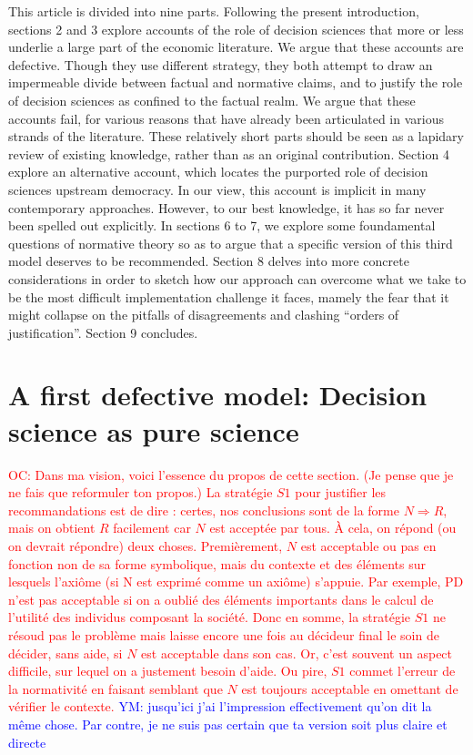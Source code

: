 \documentclass[preprint, french, english, 11pt, authoryear]{elsarticle}%
\newcommand{\commentYM}[1]{\textcolor{blue}{YM: #1}}
\newcommand{\commentOC}[1]{\textcolor{red}{OC: #1}}
\begin{document}
This article is divided into nine parts. Following the present introduction, sections 2 and 3 explore accounts of the role of decision sciences that more or less underlie a large part of the economic literature. We argue that these accounts are defective. Though they use different strategy, they both attempt to draw an impermeable divide between factual and normative claims, and to justify the role of decision sciences as confined to the factual realm. We argue that these accounts fail, for various reasons that have already been articulated in various strands of the literature. These relatively short parts should be seen as a lapidary review of existing knowledge, rather than as an original contribution. Section 4 explore an alternative account, which locates the purported role of decision sciences upstream democracy. In our view, this account is implicit in many contemporary approaches. However, to our best knowledge, it has so far never been spelled out explicitly. In sections 6 to 7, we explore some foundamental questions of normative theory so as to argue that a specific version of this third model deserves to be recommended. Section 8 delves into more concrete considerations in order to sketch how our approach can overcome what we take to be the most difficult implementation challenge it faces, mamely the fear that it might collapse on the pitfalls of disagreements and clashing ``orders of justification''. Section 9 concludes.

\section{A first defective model: Decision science as pure science}
\commentOC{Dans ma vision, voici l’essence du propos de cette section. (Je pense que je ne fais que reformuler ton propos.) La stratégie $S1$ pour justifier les recommandations est de dire : certes, nos conclusions sont de la forme $N ⇒ R$, mais on obtient $R$ facilement car $N$ est acceptée par tous. À cela, on répond (ou on devrait répondre) deux choses. Premièrement, $N$ est acceptable ou pas en fonction non de sa forme symbolique, mais du contexte et des éléments sur lesquels l’axiôme (si N est exprimé comme un axiôme) s’appuie. Par exemple, PD n’est pas acceptable si on a oublié des éléments importants dans le calcul de l’utilité des individus composant la société. Donc en somme, la stratégie $S1$ ne résoud pas le problème mais laisse encore une fois au décideur final le soin de décider, sans aide, si $N$ est acceptable dans son cas. Or, c’est souvent un aspect difficile, sur lequel on a justement besoin d’aide. Ou pire, $S1$ commet l’erreur de la normativité en faisant semblant que $N$ est toujours acceptable en omettant de vérifier le contexte. }
\commentYM{jusqu'ici j'ai l'impression effectivement qu'on dit la même chose. Par contre, je ne suis pas certain que ta version soit plus claire et directe}
\end{document}
